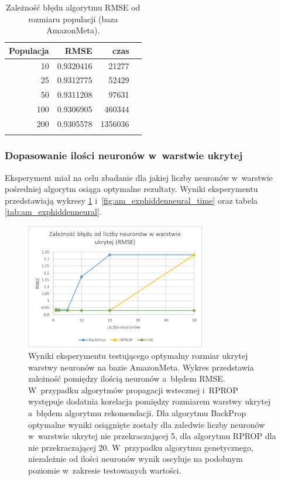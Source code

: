 \documentclass[twoside]{iisthesis}
\begin{document}
			\begin{longtable}{r||rrr}
				\label{tab:am_exppopulation}
				\centering
				\textbf{Populacja} & \textbf{RMSE} & \textbf{czas} \\
				\hline
				10        & 0.9320416  & 21277 \\
				25        & 0.9312775  & 52429 \\
				50        & 0.9311208  & 97631 \\
				100       & 0.9306905  & 460344 \\
				200       & 0.9305578  & 1356036 \\
				\caption{Zależność błędu algorytmu RMSE od rozmiaru populacji (baza AmazonMeta).}
			\end{longtable}
			
			\subsubsection{Dopasowanie ilości neuronów w~warstwie ukrytej}
			
				Eksperyment miał na celu zbadanie dla jakiej liczby neuronów w~warstwie pośredniej algorytm osiąga optymalne rezultaty. Wyniki eksperymentu przedstawiają wykresy \ref{fig:am_exphiddenneural_rmse} i~\ref{fig:am_exphiddenneural_time} oraz tabela \ref{tab:am_exphiddenneural}. 
			
				\begin{figure}
					\centering
					\includegraphics[width=0.7\textwidth]{am_exphiddenneural_rmse}
					\caption{Wyniki eksperymentu testującego optymalny rozmiar ukrytej warstwy neuronów na bazie AmazonMeta. Wykres przedstawia zależność pomiędzy ilością neuronów a~błędem RMSE. W~przypadku algorytmów propagacji wstecznej i~RPROP występuje dodatnia korelacja pomiędzy rozmiarem warstwy ukrytej a~błędem algorytmu rekomendacji. Dla algorytmu BackProp optymalne wyniki osiągnięte zostały dla zaledwie liczby neuronów w~warstwie ukrytej nie przekraczającej 5, dla algorytmu RPROP dla nie przekraczającej 20. W~przypadku algorytmu genetycznego, niezależnie od ilości neuronów wynik oscyluje na podobnym poziomie w~zakresie testowanych wartości.}
					\label{fig:am_exphiddenneural_rmse}
				\end{figure}
				
\end{document}

